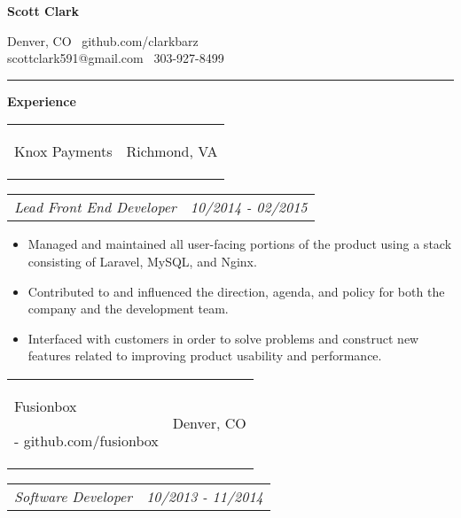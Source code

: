 \documentclass[11pt]{article}
\makeatletter
\newcommand{\headerrow}[2]
{\begin{tabular*}{\linewidth}{l@{\extracolsep{\fill}}r}
	#1 &
	#2 \\
\end{tabular*}}
\makeatother
\begin{document}
\begin{center}
	\begin{huge}
		\bf Scott Clark
	\end{huge}
	
	\large Denver, CO \textbullet\ github.com/clarkbarz \\
	\large scottclark591@gmail.com \textbullet\ 303-927-8499 \\
\end{center}

\vspace{-0.5em}
\hrule
\vspace{0.8em}

\begin{LARGE}
	\bf Experience
\end{LARGE}

\vspace{0.5em}
\headerrow
	{\begin{Large}Knox Payments\end{Large}}
	{Richmond, VA}
\headerrow
	{\textit{Lead Front End Developer}}
	{\textit{10/2014 - 02/2015}}
	
\vspace{-0.8em}
\begin{itemize}
	\item Managed and maintained all user-facing portions of the product using a stack consisting of Laravel, MySQL, and Nginx.
	\vspace{-0.6em}
	\item Contributed to and influenced the direction, agenda, and policy for both the company and the development team.
	\vspace{-0.6em}
	\item Interfaced with customers in order to solve problems and construct new features related to improving product usability and performance.
\end{itemize}

\vspace{-0.6em}

\vspace{0.5em}
\headerrow
	{\begin{Large}Fusionbox\end{Large} - github.com/fusionbox}
	{Denver, CO}
\headerrow
	{\textit{Software Developer}}
	{\textit{10/2013 - 11/2014}}
	
\end{document}
